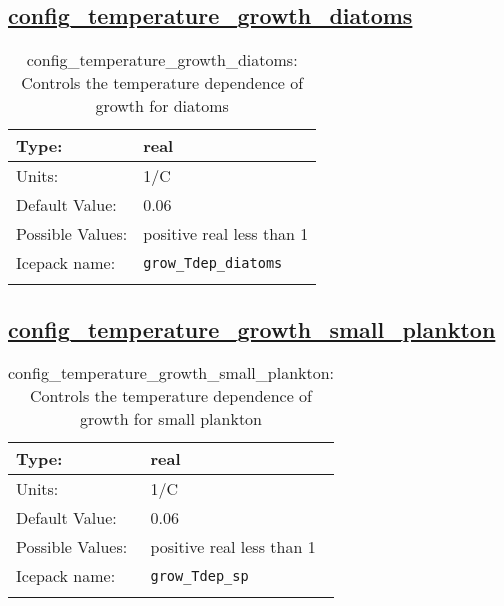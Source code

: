 \subsection[config\_temperature\_growth\_diatoms]{\hyperref[sec:nm_tab_biogeochemistry]{config\_temperature\_growth\_diatoms}}
\label{subsec:nm_sec_config_temperature_growth_diatoms}
\begin{center}
\begin{longtable}{| p{2.0in} || p{4.0in} |}
    \hline
    Type: & real \\
    \hline
    Units: & \si{1/C} \\
    \hline
    Default Value: & 0.06 \\
    \hline
    Possible Values: & positive real less than 1 \\
    \hline
    \hline
    Icepack name: & \verb+grow_Tdep_diatoms+ \\
    \caption{config\_temperature\_growth\_diatoms: Controls the temperature dependence of growth for diatoms}
\end{longtable}
\end{center}
\subsection[config\_temperature\_growth\_small\_plankton]{\hyperref[sec:nm_tab_biogeochemistry]{config\_temperature\_growth\_small\_plankton}}
\label{subsec:nm_sec_config_temperature_growth_small_plankton}
\begin{center}
\begin{longtable}{| p{2.0in} || p{4.0in} |}
    \hline
    Type: & real \\
    \hline
    Units: & \si{1/C} \\
    \hline
    Default Value: & 0.06 \\
    \hline
    Possible Values: & positive real less than 1 \\
    \hline
    \hline
    Icepack name: & \verb+grow_Tdep_sp+ \\
    \caption{config\_temperature\_growth\_small\_plankton: Controls the temperature dependence of growth for small plankton}
\end{longtable}
\end{center}
